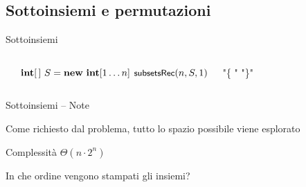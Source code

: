 \subsection{Sottoinsiemi e permutazioni}

\begin{frame}{Sottoinsiemi}

\vspace{-9pt}

\vspace{-12pt}
\begin{columns}[T]
\begin{Procedure}
\caption[A]{(\INTEGER $n$, $\INTEGER[\,]\ S$, \INTEGER $i$)}
\end{Procedure}
\begin{Procedure}
\caption[A]{\enumerasottoinsiemi(\INTEGER $n$)}
$\INTEGER[\,]\ S = \NEW\ \INTEGER[1 \ldots n]$\;
$\textsf{{\small subsetsRec}}(n, S,1)$\;
\end{Procedure}

\vspace{-12pt}
\begin{Procedure}
\caption[A]{\processSolution($\INTEGER[\,]\ S$, \INTEGER $n$)}
  \PRINT "\{ "\;
  \PRINTLN "\}"
\end{Procedure}

\end{columns}

\end{frame}

\begin{frame}{Sottoinsiemi -- Note}
	
\BIL
\item Come richiesto dal problema, tutto lo spazio possibile viene esplorato
\item Complessità $\Theta(n \cdot 2^n)$
\item In che ordine vengono stampati gli insiemi?
\EIL

\end{frame}

